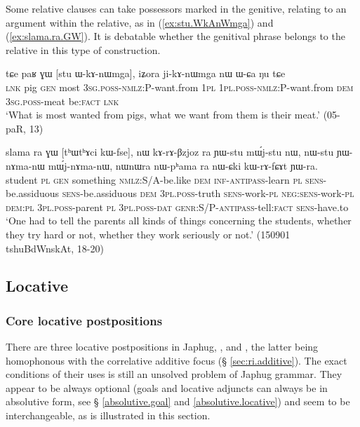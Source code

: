 Some relative clauses can take possessors marked in the genitive, relating to an argument within the relative, as in  (\ref{ex:stu.WkAnWmga}) and (\ref{ex:slama.ra.GW}). It is debatable whether the genitival phrase belongs to the relative in this type of construction.

\begin{exe}
\ex \label{ex:stu.WkAnWmga}
 \gll tɕe paʁ ɣɯ [stu ɯ-kɤ-nɯmga], iʑora ji-kɤ-nɯmga nɯ ɯ-ɕa ŋu tɕe \\
 \textsc{lnk} pig \textsc{gen} most \textsc{3sg}.\textsc{poss}-\textsc{nmlz}:P-want.from \textsc{1pl} \textsc{1pl}.\textsc{poss}-\textsc{nmlz}:P-want.from \textsc{dem} \textsc{3sg}.\textsc{poss}-meat be:\textsc{fact} \textsc{lnk} \\
\glt  `What is most wanted from pigs, what we want from them is their meat.' (05-paR, 13)
\end{exe}

\begin{exe}
\ex \label{ex:slama.ra.GW}
\gll  slama ra ɣɯ [tʰɯtʰɤci kɯ-fse], nɯ kɤ-rɤ-βzjoz ra ɲɯ-stu mɯ́j-stu nɯ, nɯ-stu ɲɯ-nɤma-nɯ mɯ́j-nɤma-nɯ,  nɯnɯra nɯ-pʰama ra nɯ-ɕki kɯ-rɤ-fɕɤt ɲɯ-ra. \\
student \textsc{pl} \textsc{gen} something \textsc{nmlz}:S/A-be.like \textsc{dem}  \textsc{inf}-\textsc{antipass}-learn \textsc{pl} \textsc{sens}-be.assiduous \textsc{sens}-be.assiduous \textsc{dem} \textsc{3pl}.\textsc{poss}-truth \textsc{sens}-work-\textsc{pl} \textsc{neg:sens}-work-\textsc{pl} \textsc{dem}:\textsc{pl} \textsc{3pl}.\textsc{poss}-parent \textsc{pl} \textsc{3pl}.\textsc{poss}-\textsc{dat} \textsc{genr}:S/P-\textsc{antipass}-tell:\textsc{fact} \textsc{sens}-have.to \\
\glt `One had to tell the parents all kinds of things concerning the students, whether they try hard or not, whether they work seriously or not.' (150901 tshuBdWnskAt, 18-20)
\end{exe}


\subsection{Locative} \label{sec:locative}
 

\subsubsection{Core locative postpositions} \label{sec:core.locative}
There are three locative postpositions in Japhug, ,  and , the latter being homophonous with the correlative additive focus  (§ \ref{sec:ri.additive}). The exact conditions of their uses is still an unsolved problem of Japhug grammar. They appear to be always optional (goals and locative adjuncts can always be in absolutive form, see § \ref{absolutive.goal}  and \ref{absolutive.locative}) and seem to be interchangeable, as is illustrated in this section.

